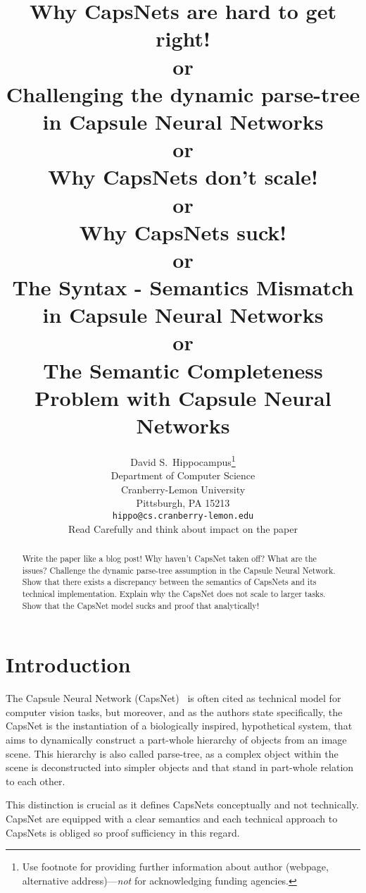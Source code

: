 \documentclass{article}
\title{                                                                                                    \large                                     
	Why CapsNets are hard to get right! \\
	or \\
	Challenging  the dynamic parse-tree in Capsule Neural Networks \\
	or \\
	Why CapsNets don't scale! \\
	or \\
	Why CapsNets suck! \\
	or \\
	The Syntax - Semantics Mismatch in Capsule Neural Networks
	\\
	or \\
	The Semantic Completeness Problem with Capsule Neural Networks
}
\author{%
  David S.~Hippocampus\thanks{Use footnote for providing further information
    about author (webpage, alternative address)---\emph{not} for acknowledging
    funding agencies.} \\
  Department of Computer Science\\
  Cranberry-Lemon University\\
  Pittsburgh, PA 15213 \\
  \texttt{hippo@cs.cranberry-lemon.edu} \\Read Carefully and think about impact on the paper
}
\begin{document}
\maketitle

\begin{abstract}
  Write the paper like a blog post!
  Why haven't CapsNet taken off?
  What are the issues?
  Challenge the dynamic parse-tree assumption in the Capsule Neural Network.
  Show that there exists a discrepancy between the semantics of CapsNets and its technical implementation.
  Explain why the CapsNet does not scale to larger tasks.
  Show that the CapsNet model sucks and proof that analytically!
\end{abstract}

\begin{comment}
	TODO
	- Think about motivation for parse trees, then motivate experiements accordingly
	- Add better less exhaustive introduction
	- Rework related work
	\url{https://en.wikipedia.org/wiki/Completeness_(logic)}
	
	TODO Meta:
	- Argument around Syntax and Semantics like with logical Systems
	- Choose a central argument that builds the core of the overall argumentation line
	- Build everythign else around that argument.
	
	IDEA:
	- Title in parse-tree form
\end{comment}
\section{Introduction}


The Capsule Neural Network (CapsNet)~\cite{nips/SabourFH17} is often cited as technical model for computer vision tasks, but moreover, and as the authors state specifically, the CapsNet is the instantiation of a biologically inspired, hypothetical system, that aims to dynamically construct a part-whole hierarchy of objects from an image scene. This hierarchy is also called parse-tree, as a complex object within the scene is deconstructed into simpler objects and that stand in part-whole relation to each other.

This distinction is crucial as it defines CapsNets conceptually and not technically. CapsNet are equipped with a clear semantics and each technical approach to CapsNets is obliged so proof sufficiency in this regard. 
\end{document}
